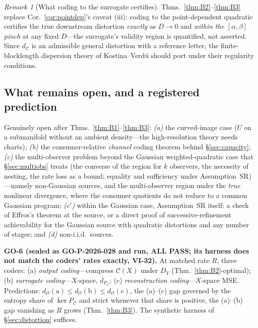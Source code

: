 \documentclass[11pt]{article}
\theoremstyle{definition}
\theoremstyle{remark}
\newtheorem*{remark}{Remark}
\newcommand{\PC}{P_{\mathcal{C}}}
\newcommand{\dO}{d_{\mathcal{O}}}
\begin{document}
\begin{remark}[What coding to the surrogate certifies]
Thms.~\ref{thm:B2}--\ref{thm:B3} replace Cor.~\ref{cor:pointdep}'s caveat (iii): coding
to the point-dependent quadratic certifies the true downstream distortion \emph{exactly}
as $D\to0$ and \emph{within the $[\alpha,\beta]$ pinch} at any fixed $D$---the
surrogate's validity region is quantified, not asserted. Since $d_{\mathcal{C}}$ is an
admissible general distortion with a reference letter, the finite-blocklength dispersion
theory of Kostina--Verd\'u \cite{kostinaverdu2012} should port under their regularity
conditions.
\end{remark}

\subsection{What remains open, and a registered prediction}\label{subsec:open}

Genuinely open after Thms.~\ref{thm:B1}--\ref{thm:B3}: \emph{(a)} the curved-image case
($U$ on a submanifold without an ambient density---the high-resolution theory needs
charts); \emph{(b)} the consumer-relative \emph{channel} coding theorem behind
\S\ref{sec:capacity}; \emph{(c)} the multi-observer problem beyond the Gaussian weighted-quadratic case that
\S\ref{sec:multiobs} treats (the converse of the region for $k$ observers, the necessity
of nesting, the rate loss as a bound; equality and sufficiency under Assumption~SR)---namely
non-Gaussian sources, and
the multi-observer region under the
\emph{true} nonlinear divergence, where the consumer quotients do not reduce to a common
Gaussian program; \emph{(c$'$)} within the Gaussian case, Assumption~SR itself: a check
of Effros's theorem at the source, or a direct proof of successive-refinement
achievability for the Gaussian source with quadratic distortions and any number of stages;
and
\emph{(d)} non-i.i.d.\ sources.

\smallskip\noindent\textbf{GO-6 (sealed as GO-P-2026-028 and run, ALL PASS; its harness
does not match the coders' rates exactly, VI-32).} At matched
rate $R$, three coders: (a) \emph{output coding}---compress $\mathcal{C}(X)$ under $D_Y$
(Thm.~\ref{thm:B2}-optimal); (b) \emph{surrogate coding}---$X$-space, $d_{\PC}$;
(c) \emph{reconstruction coding}---$X$-space MSE. Predictions:
$\dO(\mathrm a)\le\dO(\mathrm b)\le\dO(\mathrm c)$, the (a)--(c) gap governed by the
entropy share of $\ker\PC$ and strict whenever that share is positive, the (a)--(b) gap
vanishing as $R$ grows (Thm.~\ref{thm:B3}). The synthetic harness of
\S\ref{sec:distortion} suffices.
\end{document}
